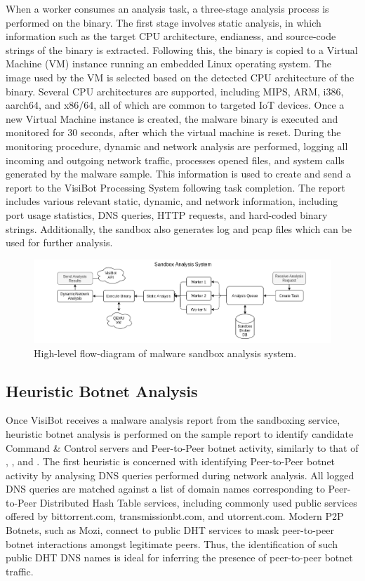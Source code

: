 When a worker consumes an analysis task, a three-stage analysis process is performed on the binary. The first stage involves static analysis, in which information such as the target CPU architecture, endianess, and source-code strings of the binary is extracted. Following this, the binary is copied to a Virtual Machine (VM) instance running an embedded Linux operating system. The image used by the VM is selected based on the detected CPU architecture of the binary. Several CPU architectures are supported, including MIPS, ARM, i386, aarch64, and x86/64, all of which are common to targeted IoT devices. Once a new Virtual Machine instance is created, the malware binary is executed and monitored for 30 seconds, after which the virtual machine is reset. During the monitoring procedure, dynamic and network analysis are performed, logging all incoming and outgoing network traffic, processes opened files, and system calls generated by the malware sample. This information is used to create and send a report to the VisiBot Processing System following task completion. The report includes various relevant static, dynamic, and network information, including port usage statistics, DNS queries, HTTP requests, and hard-coded binary strings. Additionally, the sandbox also generates log and pcap files which can be used for further analysis. 

\begin{figure}[!htb]
    \centering
    \includegraphics[width=0.9\linewidth]{flowcharts/high_level_sandbox_overview.png}
    \caption{High-level flow-diagram of malware sandbox analysis system.}
    \label{fig:high_level_sandbox} 
\end{figure}

\subsection{Heuristic Botnet Analysis}

Once VisiBot receives a malware analysis report from the sandboxing service, heuristic botnet analysis is performed on the sample report to identify candidate Command \& Control servers and Peer-to-Peer botnet activity, similarly to that of \citet{Bastos2019}, \citet{Ceron2019}, and \citet{Herwig2019}. The first heuristic is concerned with identifying Peer-to-Peer botnet activity by analysing DNS queries performed during network analysis. All logged DNS queries are matched against a list of domain names corresponding to Peer-to-Peer Distributed Hash Table services, including commonly used public services offered by bittorrent.com, transmissionbt.com, and utorrent.com. Modern P2P Botnets, such as Mozi, connect to public DHT services to mask peer-to-peer botnet interactions amongst legitimate peers. Thus, the identification of such public DHT DNS names is ideal for inferring the presence of peer-to-peer botnet traffic. 

